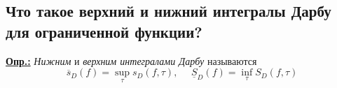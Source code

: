 
\subsection{Что такое верхний и нижний интегралы Дарбу для ограниченной функции?}

\textbf{\underline{Опр.:} } \textit{Нижним} и \textit{верхним интегралами Дарбу}   называются 
\[\overline{s}_D(f) = \sup_{\tau}s_D(f, \tau), \ \ \ \ \ \ \underline{S}_D(f) = \inf_{\tau}S_D(f, \tau)\]


